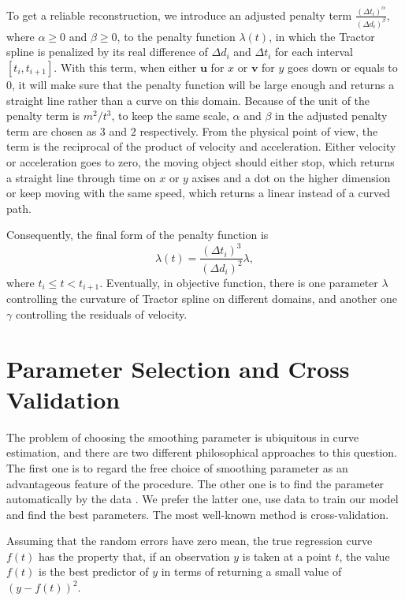 To get a reliable reconstruction, we introduce an adjusted penalty term $\frac{(\Delta t_i)^\alpha}{(\Delta d_i)^\beta}$, where $\alpha \ge 0$ and $\beta \ge 0$, to the penalty function $\lambda(t)$, in which the Tractor spline is penalized by its real difference of $\Delta d_i$ and $\Delta t_i$ for each interval $[t_i, t_{i+1}]$. With this term, when either $\mathbf{u}$ for $x$ or $\mathbf{v}$ for $y$ goes down or equals to 0, it will make sure that the penalty function will be large enough and returns a straight line rather than a curve on this domain. Because of the unit of the penalty term is $m^2/t^3$, to keep the same scale, $\alpha$ and $\beta$ in the adjusted penalty term are chosen as $3$ and $2$ respectively. From the physical point of view, the term is the reciprocal of the product of velocity and acceleration. Either velocity or acceleration goes to zero, the moving object should either stop, which returns a straight line through time on $x$ or $y$ axises and a dot on the higher dimension or keep moving with the same speed, which returns a linear instead of a curved path. 

Consequently, the final form of the penalty function is 
\begin{equation}\label{adjustedpenalty}
\lambda(t)=\frac{(\Delta t_i)^3}{(\Delta d_i)^2}\lambda,
\end{equation}
where  $t_i\leq t < t_{i+1}$. Eventually, in objective function, there is one parameter $\lambda$ controlling the curvature of Tractor spline on different domains, and another one $\gamma$ controlling the residuals of velocity. 




\section{Parameter Selection and Cross Validation}

The problem of choosing the smoothing parameter is ubiquitous in curve estimation, and there are two different philosophical approaches to this question. The first one is to regard the free choice of smoothing parameter as an advantageous feature of the procedure. The other one is to find the parameter automatically by the data \cite{green1993nonparametric}. We prefer the latter one, use data to train our model and find the best parameters. The most well-known method is cross-validation.


Assuming that the random errors have zero mean, the true regression curve $f(t)$ has the property that, if an observation $y$ is taken at a point $t$, the value $f(t)$ is the best predictor of $y$ in terms of returning a small value of $(y-f(t))^2$. 

